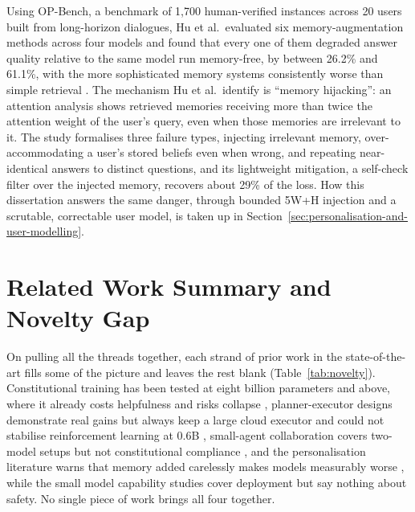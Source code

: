 Using OP-Bench, a benchmark of 1,700 human-verified instances across 20 users built from long-horizon dialogues, Hu et al.\ evaluated six memory-augmentation methods across four models and found that every one of them degraded answer quality relative to the same model run memory-free, by between 26.2\% and 61.1\%, with the more sophisticated memory systems consistently worse than simple retrieval \cite{hu2026opbenchbenchmarkingoverpersonalizationmemoryaugmented}. The mechanism Hu et al.\ identify is ``memory hijacking'': an attention analysis shows retrieved memories receiving more than twice the attention weight of the user's query, even when those memories are irrelevant to it. The study formalises three failure types, injecting irrelevant memory, over-accommodating a user's stored beliefs even when wrong, and repeating near-identical answers to distinct questions, and its lightweight mitigation, a self-check filter over the injected memory, recovers about 29\% of the loss. How this dissertation answers the same danger, through bounded 5W+H injection and a scrutable, correctable user model, is taken up in Section~\ref{sec:personalisation-and-user-modelling}.

\section{Related Work Summary and Novelty Gap}
\label{sec:related-work-summary-and-novelty-gap}

On pulling all the threads together, each strand of prior work in the state-of-the-art fills some of the picture and leaves the rest blank (Table~\ref{tab:novelty}). Constitutional training has been tested at eight billion parameters and above, where it already costs helpfulness and risks collapse \cite{bai2022constitutionalaiharmlessnessai, zhang2025constitutioncollapseexploringconstitutional}, planner-executor designs demonstrate real gains but always keep a large cloud executor and could not stabilise reinforcement learning at 0.6B \cite{wei2025reactplannercentricframeworkcomplex}, small-agent collaboration covers two-model setups but not constitutional compliance \cite{zywot2026smallagentscollaboratebeat}, and the personalisation literature warns that memory added carelessly makes models measurably worse \cite{hu2026opbenchbenchmarkingoverpersonalizationmemoryaugmented}, while the small model capability studies cover deployment but say nothing about safety. No single piece of work brings all four together.

